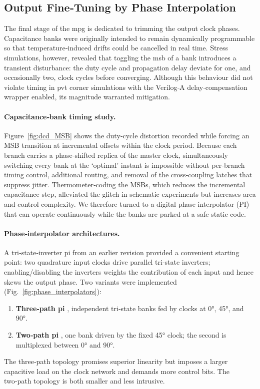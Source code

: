 \subsection{Output Fine‑Tuning by Phase Interpolation}\label{sec:output_finetuning}
The final stage of the \gls{mpg} is dedicated to trimming the output clock phases. Capacitance banks were originally intended to remain dynamically programmable so that temperature‑induced drifts could be cancelled in real time. Stress simulations, however, revealed that toggling the \gls{msb} of a bank introduces a transient disturbance: the duty cycle and propagation delay deviate for one, and occasionally two, clock cycles before converging. Although this behaviour did not violate timing in \gls{pvt} corner simulations with the Verilog‑A delay‑compensation wrapper enabled, its magnitude warranted mitigation.
\paragraph{Capacitance‑bank timing study.} Figure~\ref{fig:dcd_MSB} shows the duty‑cycle distortion recorded while forcing an MSB transition at incremental offsets within the clock period. Because each branch carries a phase‑shifted replica of the master clock, simultaneously switching every bank at the ‘optimal’ instant is impossible without per‑branch timing control, additional routing, and removal of the cross‑coupling latches that suppress jitter. Thermometer‑coding the MSBs, which reduces the incremental capacitance step, alleviated the glitch in schematic experiments but increases area and control complexity. We therefore turned to a digital phase interpolator (PI) that can operate continuously while the banks are parked at a safe static code.
\paragraph{Phase‑interpolator architectures.} A tri‑state‑inverter \gls{pi} from an earlier revision provided a convenient starting point: two quadrature input clocks drive parallel tri‑state inverters; enabling/disabling the inverters weights the contribution of each input and hence skews the output phase. Two variants were implemented (Fig.~\ref{fig:phase_interpolators}):
\begin{enumerate}
\item \textbf{Three‑path \gls{pi}} ,  independent tri‑state banks fed by clocks at \ang{0}, \ang{45}, and \ang{90}.
\item \textbf{Two‑path \gls{pi}} ,  one bank driven by the fixed \ang{45} clock; the second is multiplexed between \ang{0} and \ang{90}.
\end{enumerate}
The three‑path topology promises superior linearity but imposes a larger capacitive load on the clock network and demands more control bits. The two‑path topology is both smaller and less intrusive.
